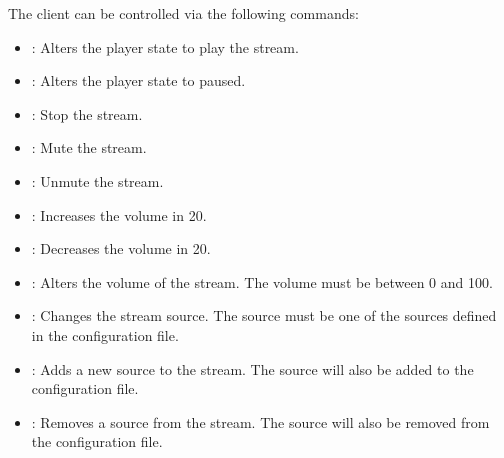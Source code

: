 \documentclass[letterpaper,10pt,english]{sphinxmanual}
\begin{document}
\sphinxAtStartPar
The client can be controlled via the following commands:
\begin{itemize}
\item {} 
\sphinxAtStartPar
{}: Alters the player state to play the stream.

\item {} 
\sphinxAtStartPar
{}: Alters the player state to paused.

\item {} 
\sphinxAtStartPar
{}: Stop the stream.

\item {} 
\sphinxAtStartPar
{}: Mute the stream.

\item {} 
\sphinxAtStartPar
{}: Unmute the stream.

\item {} 
\sphinxAtStartPar
{}: Increases the volume in 20.

\item {} 
\sphinxAtStartPar
{}: Decreases the volume in 20.

\item {} 
\sphinxAtStartPar
{}: Alters the volume of the stream. The volume must be between 0 and 100.

\item {} 
\sphinxAtStartPar
{}: Changes the stream source. The source must be one of the sources defined in the configuration file.

\item {} 
\sphinxAtStartPar
{}: Adds a new source to the stream. The source will also be added to the configuration file.

\item {} 
\sphinxAtStartPar
{}: Removes a source from the stream. The source will also be removed from the configuration file.

\end{itemize}
\end{document}
